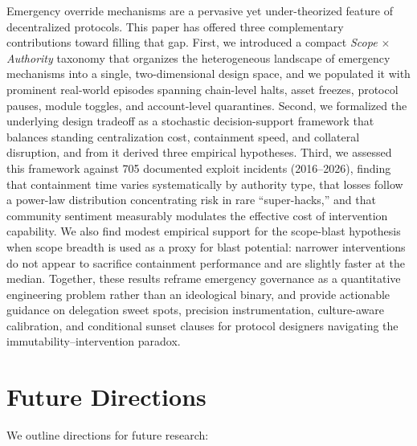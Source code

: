 \documentclass[12pt]{article}
\newif\ifconcise
\begin{document}
Emergency override mechanisms are a pervasive yet under-theorized feature of decentralized protocols.
This paper has offered three complementary contributions toward filling that gap.
First, we introduced a compact \emph{Scope $\times$ Authority} taxonomy that organizes the heterogeneous landscape of emergency mechanisms into a single, two-dimensional design space, and we populated it with prominent real-world episodes spanning chain-level halts, asset freezes, protocol pauses, module toggles, and account-level quarantines.
Second, we formalized the underlying design tradeoff as a stochastic decision-support framework that balances standing centralization cost, containment speed, and collateral disruption, and from it derived three empirical hypotheses.
Third, we assessed this framework against 705 documented exploit incidents (2016--2026), finding that containment time varies systematically by authority type, that losses follow a power-law distribution concentrating risk in rare ``super-hacks,'' and that community sentiment measurably modulates the effective cost of intervention capability. We also find modest empirical support for the scope-blast hypothesis when scope breadth is used as a proxy for blast potential: narrower interventions do not appear to sacrifice containment performance and are slightly faster at the median.
Together, these results reframe emergency governance as a quantitative engineering problem rather than an ideological binary, and provide actionable guidance on delegation sweet spots, precision instrumentation, culture-aware calibration, and conditional sunset clauses for protocol designers navigating the immutability--intervention paradox.



\ifconcise\else
\section{Future Directions}
\label{subsec:future}

We outline directions for future research:
\end{document}
